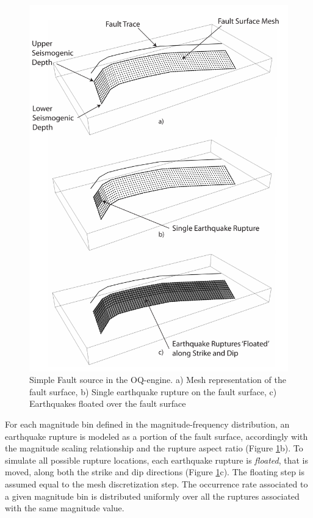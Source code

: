 \begin{figure}
\centering
\includegraphics[width=14cm]{./Pictures/SimpleFaultSource.pdf}
\caption{Simple Fault source in the OQ-engine. a) Mesh representation of the fault surface, b) Single earthquake rupture on the fault surface, c) Earthquakes floated over the fault surface}
\label{fig:SimpleFaultSource}
\end{figure}
For each magnitude bin defined in the magnitude-frequency distribution, an earthquake rupture is modeled as a portion of the fault surface, accordingly with the magnitude scaling relationship and the rupture aspect
ratio (Figure \ref{fig:SimpleFaultSource}b). To simulate all possible rupture locations, each earthquake rupture is \textit{floated}, that is moved, along both the strike and dip directions (Figure
\ref{fig:SimpleFaultSource}c). The floating step is assumed equal to the mesh discretization step.
The occurrence rate associated to a given magnitude bin is distributed uniformly over all the ruptures associated with the same magnitude value.
